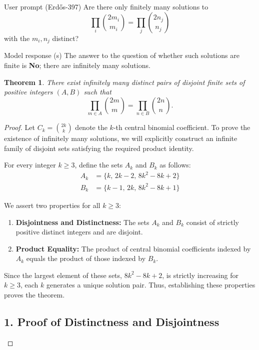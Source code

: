 \documentclass[11pt]{article}
\newtheorem{theorem}{Theorem}
\begin{document}
\begin{problem}{User prompt (Erd\H{o}s-397)}
Are there only finitely many solutions to\[\prod_i \binom{2m_i}{m_i}=\prod_j \binom{2n_j}{n_j}\]with the $m_i,n_j$ distinct?
\end{problem}

\begin{solution}{Model response (s)}
The answer to the question of whether such solutions are finite is \textbf{No}; there are infinitely many solutions.

\begin{theorem}
There exist infinitely many distinct pairs of disjoint finite sets of positive integers $(A, B)$ such that
\[ \prod_{m \in A} \binom{2m}{m} = \prod_{n \in B} \binom{2n}{n}. \]
\end{theorem}

\begin{proof}
Let $C_k = \binom{2k}{k}$ denote the $k$-th central binomial coefficient. To prove the existence of infinitely many solutions, we will explicitly construct an infinite family of disjoint sets satisfying the required product identity.

For every integer $k \ge 3$, define the sets $A_k$ and $B_k$ as follows:
\begin{align*}
A_k &= \{k, \, 2k-2, \, 8k^2-8k+2\} \\
B_k &= \{k-1, \, 2k, \, 8k^2-8k+1\}
\end{align*}

We assert two properties for all $k \ge 3$:
\begin{enumerate}
    \item \textbf{Disjointness and Distinctness:} The sets $A_k$ and $B_k$ consist of strictly positive distinct integers and are disjoint.
    \item \textbf{Product Equality:} The product of central binomial coefficients indexed by $A_k$ equals the product of those indexed by $B_k$.
\end{enumerate}

Since the largest element of these sets, $8k^2-8k+2$, is strictly increasing for $k \ge 3$, each $k$ generates a unique solution pair. Thus, establishing these properties proves the theorem.

\subsection*{1. Proof of Distinctness and Disjointness}


\end{proof}
\end{solution}
\end{document}
